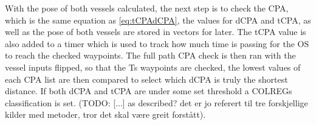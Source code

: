 
With the pose of both vessels calculated, the next step is to check the CPA, which is the same equation as \eqref{eq:tCPAdCPA}, the values for
\gls{dCPA} and \gls{tCPA}, as well as the pose of both vessels are stored in vectors for later. The \gls{tCPA} value is also added to a timer which is
used to track how much time is passing for the \gls{OS} to reach the checked waypoints.
The full path CPA check is then ran with the vessel inputs flipped, so that the \gls{Ts} waypoints are checked, the lowest values of each CPA list
are then compared to select which \gls{dCPA} is truly the shortest distance. If both dCPA and tCPA are under some set threshold a COLREGs classification is set.
(TODO: [...] as described? det er jo referert til tre forskjellige kilder med metoder, tror det skal være greit forstått).

